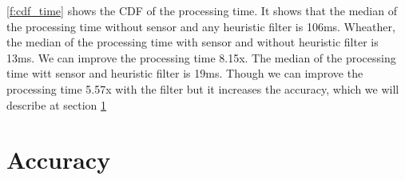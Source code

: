 \ref{f:cdf_time} shows the CDF of the processing time.
It shows that the median of the processing time without sensor and any heuristic filter is 106ms.
Wheather, the median of the processing time with sensor and without heuristic filter is 13ms.
We can improve the processing time 8.15x.
The median of the processing time witt sensor and heuristic filter is 19ms.
Though we can improve the processing time 5.57x with the filter but it increases the accuracy, which we will describe at section \ref{s:acc}

\section{Accuracy}
\label{s:acc}



